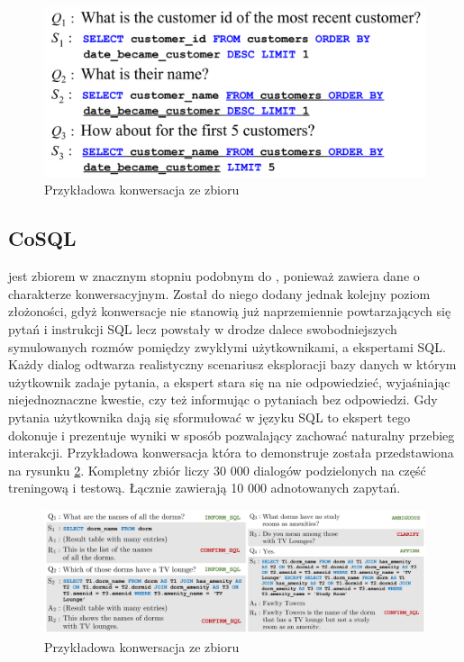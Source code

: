 \begin{figure}[ht!]
  \centering
  \includegraphics[width=0.6\linewidth]{images/sparc_example.png}
  \caption[Przykładowa konwersacja ze zbioru ]{Przykładowa konwersacja ze zbioru }
  \label{fig:sparc-example}
\end{figure}

\subsection{CoSQL}
 jest zbiorem w znacznym stopniu podobnym do , ponieważ zawiera dane o charakterze konwersacyjnym. Został do niego dodany jednak kolejny poziom złożoności, gdyż konwersacje nie stanowią już naprzemiennie powtarzających się pytań i instrukcji SQL lecz powstały w drodze dalece swobodniejszych symulowanych rozmów pomiędzy zwykłymi użytkownikami, a ekspertami SQL. Każdy dialog odtwarza realistyczny scenariusz eksploracji bazy danych w którym użytkownik zadaje pytania, a ekspert stara się na nie odpowiedzieć, wyjaśniając niejednoznaczne kwestie, czy też informując o pytaniach bez odpowiedzi. Gdy pytania użytkownika dają się sformułować w języku SQL to ekspert tego dokonuje i prezentuje wyniki w sposób pozwalający zachować naturalny przebieg interakcji. Przykładowa konwersacja która to demonstruje została przedstawiona na rysunku \ref{fig:cosql-example}. Kompletny zbiór liczy 30 000 dialogów podzielonych na część treningową i testową. Łącznie zawierają 10 000 adnotowanych zapytań.

\begin{figure}[ht!]
  \centering
  \includegraphics[width=1.0\linewidth]{images/cosql_example.png}
  \caption[Przykładowa konwersacja ze zbioru ]{Przykładowa konwersacja ze zbioru }
  \label{fig:cosql-example}
\end{figure}

